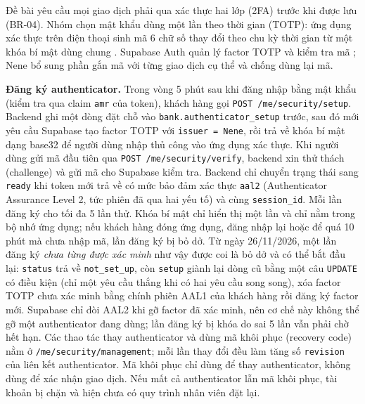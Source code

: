 Đề bài yêu cầu mọi giao dịch phải qua xác thực hai lớp (2FA) trước khi được lưu (BR-04). Nhóm chọn mật khẩu dùng một lần theo thời gian (TOTP): ứng dụng xác thực trên điện thoại sinh mã 6 chữ số thay đổi theo chu kỳ thời gian từ một khóa bí mật dùng chung \parencite{ch2-rfc6238}. Supabase Auth quản lý factor TOTP và kiểm tra mã \parencite{ch2-supabase-mfa}; Nene bổ sung phần gắn mã với từng giao dịch cụ thể và chống dùng lại mã.

\textbf{Đăng ký authenticator.} Trong vòng 5 phút sau khi đăng nhập bằng mật khẩu (kiểm tra qua claim \texttt{amr} của token), khách hàng gọi \texttt{POST /\allowbreak{}me/\allowbreak{}security/\allowbreak{}setup}. Backend ghi một dòng đặt chỗ vào \texttt{bank.\allowbreak{}authenticator\_\allowbreak{}setup} trước, sau đó mới yêu cầu Supabase tạo factor TOTP với \texttt{issuer = Nene}, rồi trả về khóa bí mật dạng base32 để người dùng nhập thủ công vào ứng dụng xác thực. Khi người dùng gửi mã đầu tiên qua \texttt{POST /\allowbreak{}me/\allowbreak{}security/\allowbreak{}verify}, backend xin thử thách (challenge) và gửi mã cho Supabase kiểm tra. Backend chỉ chuyển trạng thái sang \texttt{ready} khi token mới trả về có mức bảo đảm xác thực \texttt{aal2} (Authenticator Assurance Level 2, tức phiên đã qua hai yếu tố) và cùng \texttt{session\_\allowbreak{}id}. Mỗi lần đăng ký cho tối đa 5 lần thử. Khóa bí mật chỉ hiển thị một lần và chỉ nằm trong bộ nhớ ứng dụng; nếu khách hàng đóng ứng dụng, đăng nhập lại hoặc để quá 10 phút mà chưa nhập mã, lần đăng ký bị bỏ dở. Từ ngày 26/11/2026, một lần đăng ký \emph{chưa từng được xác minh} như vậy được coi là bỏ dở và có thể bắt đầu lại: \texttt{status} trả về \texttt{not\_\allowbreak{}set\_\allowbreak{}up}, còn \texttt{setup} giành lại dòng cũ bằng một câu \texttt{UPDATE} có điều kiện (chỉ một yêu cầu thắng khi có hai yêu cầu song song), xóa factor TOTP chưa xác minh bằng chính phiên AAL1 của khách hàng rồi đăng ký factor mới. Supabase chỉ đòi AAL2 khi gỡ factor đã xác minh, nên cơ chế này không thể gỡ một authenticator đang dùng; lần đăng ký bị khóa do sai 5 lần vẫn phải chờ hết hạn. Các thao tác thay authenticator và dùng mã khôi phục (recovery code) nằm ở \texttt{/\allowbreak{}me/\allowbreak{}security/\allowbreak{}management}; mỗi lần thay đổi đều làm tăng số \texttt{revision} của liên kết authenticator. Mã khôi phục chỉ dùng để thay authenticator, không dùng để xác nhận giao dịch. Nếu mất cả authenticator lẫn mã khôi phục, tài khoản bị chặn và hiện chưa có quy trình nhân viên đặt lại.

